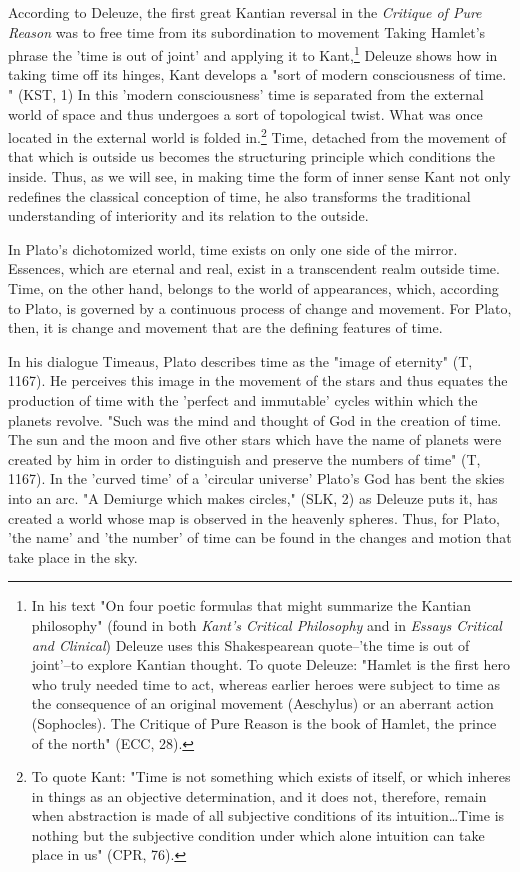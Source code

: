 According to Deleuze, the first great Kantian reversal in the \textit{Critique of Pure Reason} was to free time from its subordination to movement Taking Hamlet's phrase the 'time is out of joint' and applying it to Kant,\footnote{In his text "On four poetic formulas that might summarize the Kantian philosophy" (found in both \textit{Kant's Critical Philosophy} and in \textit{Essays Critical and Clinical}) Deleuze uses this Shakespearean quote--'the time is out of joint'--to explore Kantian thought. To quote Deleuze: "Hamlet is the first hero who truly needed time to act, whereas earlier heroes were subject to time as the consequence of an original movement (Aeschylus) or an aberrant action (Sophocles). The Critique of Pure Reason is the book of Hamlet, the prince of the north" (ECC, 28).} Deleuze shows how in taking time off its hinges, Kant develops a "sort of modern consciousness of time. " (KST, 1) In this 'modern consciousness' time is separated from the external world of space and thus undergoes a sort of  topological twist. What was once located in the external world is folded in.\footnote{To quote Kant: "Time is not something which exists of itself, or which inheres in things as an objective determination, and it does not, therefore, remain when abstraction is made of all subjective conditions of its intuition\dots Time is nothing but the subjective condition under which alone intuition can take place in us" (CPR, 76).} Time, detached from the movement of that which is outside us becomes the structuring principle which conditions the inside. Thus, as we will see, in making time the form of inner sense Kant not only redefines the classical conception of time, he also transforms the traditional understanding of interiority and its relation to the outside. 

In Plato's dichotomized world, time exists on only one side of the mirror. Essences, which are eternal and real, exist in a transcendent realm outside time. Time, on the other hand, belongs to the world of appearances, which, according to Plato, is governed by a continuous process of change and movement. For Plato, then, it is change and movement that are the defining features of time. 

In his dialogue Timeaus, Plato describes time as the "image of eternity" (T, 1167). He perceives this image in the movement of the stars and thus equates the production of time with the 'perfect and immutable' cycles within which the planets revolve. "Such was the mind and thought of God in the creation of time. The sun and the moon and five other stars which have the name of planets were created by him in order to distinguish and preserve the numbers of time" (T, 1167). In the 'curved time' of a 'circular universe' Plato's God has bent the skies into an arc. "A Demiurge which makes  circles," (SLK, 2) as Deleuze puts it, has created a world whose map is observed in the heavenly spheres. Thus, for Plato, 'the name' and 'the number' of time can be found in the changes and motion that take place in the sky. 

